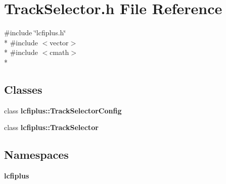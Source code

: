 \section{Track\-Selector.\-h File Reference}
\label{TrackSelector_8h}
{\ttfamily \#include \char`\"{}lcfiplus.\-h\char`\"{}}\\*
{\ttfamily \#include $<$vector$>$}\\*
{\ttfamily \#include $<$cmath$>$}\\*
\subsection*{Classes}
\begin{DoxyCompactItemize}
\item 
class {\bf lcfiplus\-::\-Track\-Selector\-Config}
\item 
class {\bf lcfiplus\-::\-Track\-Selector}
\end{DoxyCompactItemize}
\subsection*{Namespaces}
\begin{DoxyCompactItemize}
\item 
{\bf lcfiplus}
\end{DoxyCompactItemize}
